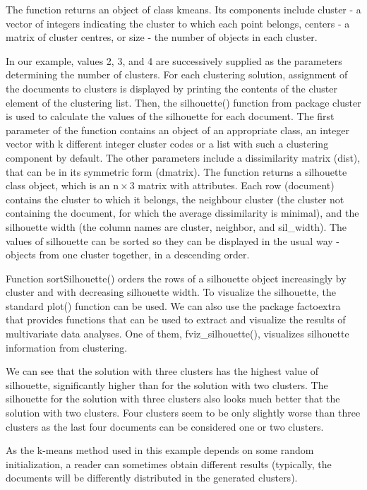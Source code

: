 \documentclass[11pt,openany,executivepaper]{book}
\begin{document}
The function returns an object of class kmeans. Its components include cluster - a vector of integers indicating the cluster to which each point belongs, centers - a matrix of cluster centres, or size - the number of objects in each cluster.

In our example, values 2, 3, and 4 are successively supplied as the parameters determining the number of clusters. For each clustering solution, assignment of the documents to clusters is displayed by printing the contents of the cluster element of the clustering list. Then, the silhouette() function from package cluster is used to calculate the values of the silhouette for each document. The first parameter of the function contains an object of an appropriate class, an integer vector with k different integer cluster codes or a list with such a clustering component by default. The other parameters include a dissimilarity matrix (dist), that can be in its symmetric form (dmatrix). The function returns a silhouette class object, which is an $\mathrm{n} \times 3$ matrix with attributes. Each row (document) contains the cluster to which it belongs, the neighbour cluster (the cluster not containing the document, for which the average dissimilarity is minimal), and the silhouette width (the column names are cluster, neighbor, and sil\_width). The values of silhouette can be sorted so they can be displayed in the usual way - objects from one cluster together, in a descending order.

Function sortSilhouette() orders the rows of a silhouette object increasingly by cluster and with decreasing silhouette width. To visualize the silhouette, the standard plot() function can be used. We can also use the package factoextra that provides functions that can be used to extract and visualize the results of multivariate data analyses. One of them, fviz\_silhouette(), visualizes silhouette information from clustering.

We can see that the solution with three clusters has the highest value of silhouette, significantly higher than for the solution with two clusters. The silhouette for the solution with three clusters also looks much better that the solution with two clusters. Four clusters seem to be only slightly worse than three clusters as the last four documents can be considered one or two clusters.

As the k-means method used in this example depends on some random initialization, a reader can sometimes obtain different results (typically, the documents will be differently distributed in the generated clusters).
\end{document}
